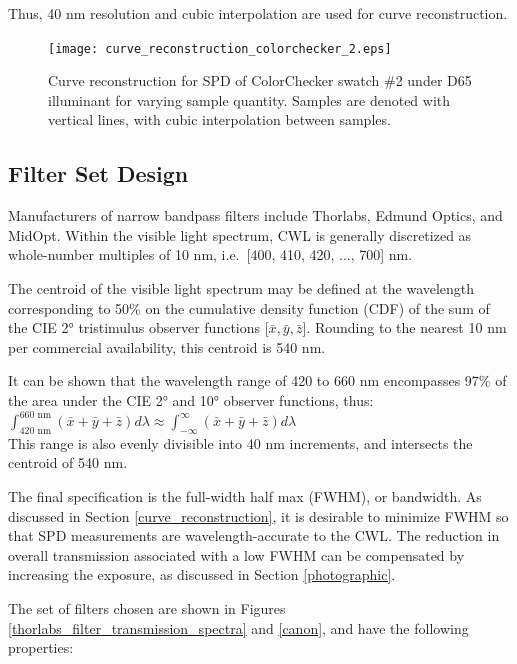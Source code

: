 \documentclass[twocolumn,10pt]{asme2ej}
\newcommand{\id}{\hspace{6 mm}}
\begin{document}
Thus, 40 nm resolution and cubic interpolation are used for curve reconstruction.

\begin{figure}
\centering
\texttt{[image: curve\_reconstruction\_colorchecker\_2.eps]}
\caption{Curve reconstruction for SPD of ColorChecker swatch \#2 under D65 illuminant for varying sample quantity. Samples are denoted with vertical lines, with cubic interpolation between samples.}
\label{curve_reconstruction_colorchecker_2}
\end{figure}

\subsection{Filter Set Design}

\label{section_filters}

Manufacturers of narrow bandpass filters include Thorlabs, Edmund Optics, and MidOpt. Within the visible light spectrum, CWL is generally discretized as whole-number multiples of 10 nm, i.e.\ [400, 410, 420, ..., 700] nm.

\id The centroid of the visible light spectrum may be defined at the wavelength corresponding to 50\% on the cumulative density function (CDF) of the sum of the CIE 2° tristimulus observer functions [$\bar{x}, \bar{y}, \bar{z}$]. \cite{CVRL} Rounding to the nearest 10 nm per commercial availability, this centroid is 540 nm.

\id It can be shown that the wavelength range of 420 to 660 nm encompasses 97\% of the area under the CIE 2° and 10° observer functions, \cite{CVRL} thus:\\

$ \displaystyle \int_{\textrm{420 nm}}^{\textrm{660 nm}} ( \bar{x}+\bar{y}+\bar{z} ) d\lambda \approx \int_{-\infty}^{\infty} ( \bar{x}+\bar{y}+\bar{z} ) d\lambda $ \\

This range is also evenly divisible into 40 nm increments, and intersects the centroid of 540 nm.

\id The final specification is the full-width half max (FWHM), or bandwidth. As discussed in Section \ref{curve_reconstruction}, it is desirable to minimize FWHM so that SPD measurements are wavelength-accurate to the CWL. The reduction in overall transmission associated with a low FWHM can be compensated by increasing the exposure, as discussed in Section \ref{photographic}.

\id The set of filters chosen are shown in Figures \ref{thorlabs_filter_transmission_spectra} and \ref{canon}, and have the following properties:\\
\end{document}
